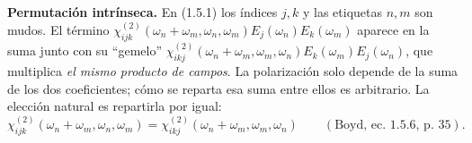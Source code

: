 \textbf{Permutación intrínseca.} En (1.5.1) los índices $j,k$ y las etiquetas $n,m$ son mudos. El término
$\chi^{(2)}_{ijk}(\omega_n+\omega_m,\omega_n,\omega_m)E_j(\omega_n)E_k(\omega_m)$ aparece en la suma junto con su ``gemelo''
$\chi^{(2)}_{ikj}(\omega_n+\omega_m,\omega_m,\omega_n)E_k(\omega_m)E_j(\omega_n)$, que multiplica \emph{el mismo producto de campos}.
La polarización solo depende de la suma de los dos coeficientes; cómo se reparta esa suma entre ellos es arbitrario.
La elección natural es repartirla por igual:
\[
\chi^{(2)}_{ijk}(\omega_n+\omega_m,\omega_n,\omega_m)=\chi^{(2)}_{ikj}(\omega_n+\omega_m,\omega_m,\omega_n)\qquad(\text{Boyd, ec.~1.5.6, p.~35}).
\]


